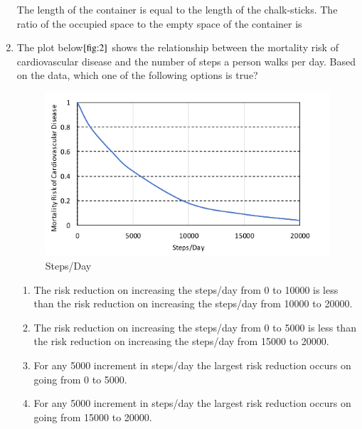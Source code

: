 \documentclass[journal]{IEEEtran}
\numberwithin{equation}{enumi}
\numberwithin{figure}{enumi}
\begin{document}
\begin{enumerate}
The length of the container is equal to the length of the chalk-sticks. The ratio of the occupied space to the empty space of the container is 
\begin{figure}[H]
    
			\centering
			
			\caption{}
			\label{fig:1}
		\end{figure}

\begin{enumerate}
\end{enumerate}
\bigskip

\item The plot below$\ref{fig:2}$ shows the relationship between the mortality risk of cardiovascular disease and the number of steps a person walks per day. Based on the data, which one of the following options is true?
\begin{figure}[H]
    \centering
    \includegraphics[width=\linewidth]{figs/2.png}
    \caption{Steps/Day}
    \label{fig:2}
    \end{figure}
\begin{enumerate}
        \item  The risk reduction on increasing the steps/day from 0 to 10000 is less than the risk reduction on increasing the steps/day from 10000 to 20000.
        \item  The risk reduction on increasing the steps/day from 0 to 5000 is less than the risk reduction on increasing the steps/day from 15000 to 20000.
        \item  For any 5000 increment in steps/day the largest risk reduction occurs on going from 0 to 5000.
        \item  For any 5000 increment in steps/day the largest risk reduction occurs on going from 15000 to 20000.
    


\end{enumerate}
\end{enumerate}
\end{document}
